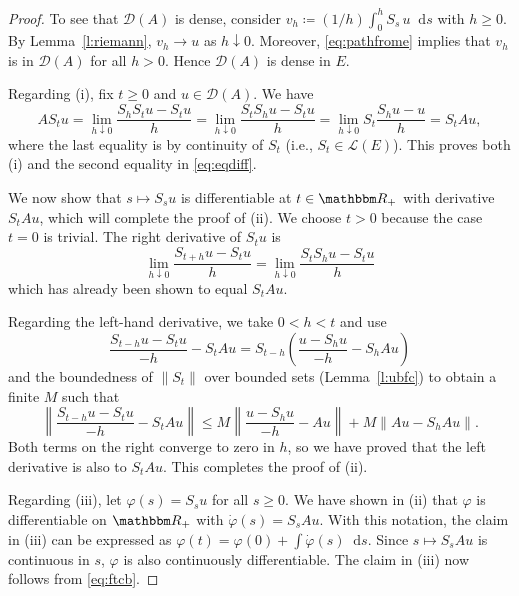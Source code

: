 \documentclass[12pt, reqno]{amsart}
\renewcommand{\leq}{\leqslant}
\renewcommand{\geq}{\geqslant}
\newcommand{\1}{\mathbbm 1}
\newcommand*\diff{\mathop{}\!\mathrm{d}}
\newcommand{\lL}{\mathcal L}
\newcommand{\dD}{\mathcal D}
\newcommand{\RR}{\mathbbm R}
\renewcommand{\phi}{\varphi}
\theoremstyle{plain}
\theoremstyle{definition}
\begin{document}
\begin{proof}
    To see that $\dD(A)$ is dense, consider $v_h \coloneq (1/h) \int_0^h S_s \,
    u \diff s$ with $h \geq 0$. By Lemma~\ref{l:riemann},  $v_h \to u$ as $h \downarrow 0$.
    Moreover, \eqref{eq:pathfrome} implies that $v_h$ is in $\dD(A)$ for
    all $h > 0$.   Hence $\dD(A)$ is dense in $E$.


    Regarding (i), fix $t \geq 0$ and $u \in \dD(A)$.  We have
    \begin{equation*}
        A S_t u
        = \lim_{h \downarrow 0} \frac{S_h S_t u - S_t u}{h}
        = \lim_{h \downarrow 0} \frac{S_t S_h u - S_t u}{h}
        = \lim_{h \downarrow 0} S_t \frac{S_h u - u}{h}
        =  S_t A u,
    \end{equation*}
    where the last equality is by continuity of $S_t$ (i.e., $S_t \in \lL(E)$).
    This proves both (i) and the second equality in \eqref{eq:eqdiff}.

    We now show that $s \mapsto S_s u$ is differentiable at $t \in \RR_+$ with
    derivative $S_t A u$, which will complete the proof of (ii). We choose $t >
    0$  because the case $t=0$ is trivial. The right derivative of $S_t u$ is 
    \begin{equation*}
        \lim_{h \downarrow 0} \frac{S_{t + h} u - S_t u}{h}
        = \lim_{h \downarrow 0} \frac{S_t S_h u - S_t u}{h}
    \end{equation*}
    which has already been shown to equal $S_t A u$.

    Regarding the left-hand derivative, we take $0 < h < t$ and use
    \begin{equation*}
        \frac{S_{t-h} u - S_t u}{-h} - S_t A u
        = S_{t-h} \left( \frac{u - S_h u}{-h} - S_h A u \right)
    \end{equation*}
    and the boundedness of $\| S_t \|$ over bounded sets (Lemma~\ref{l:ubfc}) to
    obtain a finite $M$ such that
    \begin{equation*}
        \left\|
            \frac{S_{t-h} u - S_t u}{-h} - S_t A u
        \right\|
        \leq M
        \left\|
            \frac{u - S_h u}{-h} - A u
        \right\|
        +
        M
        \left\|
            A u - S_h A u
        \right\|.
    \end{equation*}
    Both terms on the right converge to zero in $h$, so we have proved that
    the left derivative is also to $S_t A u$.  This completes the proof of (ii).

    Regarding (iii), let $\phi(s) = S_s u$ for all $s \geq 0$.  We have shown in
    (ii) that $\phi$ is differentiable on $\RR_+$ with $\dot \phi(s) = S_s A u$.  
    With this notation, the claim in (iii) can be expressed as
    $\phi(t) = \phi(0) + \int \dot \phi(s)
    \diff s$. Since $s \mapsto S_s A u$ is continuous in $s$, $\phi$ is also continuously
    differentiable.  The claim in (iii) now follows from \eqref{eq:ftcb}.
\end{proof}
\end{document}
